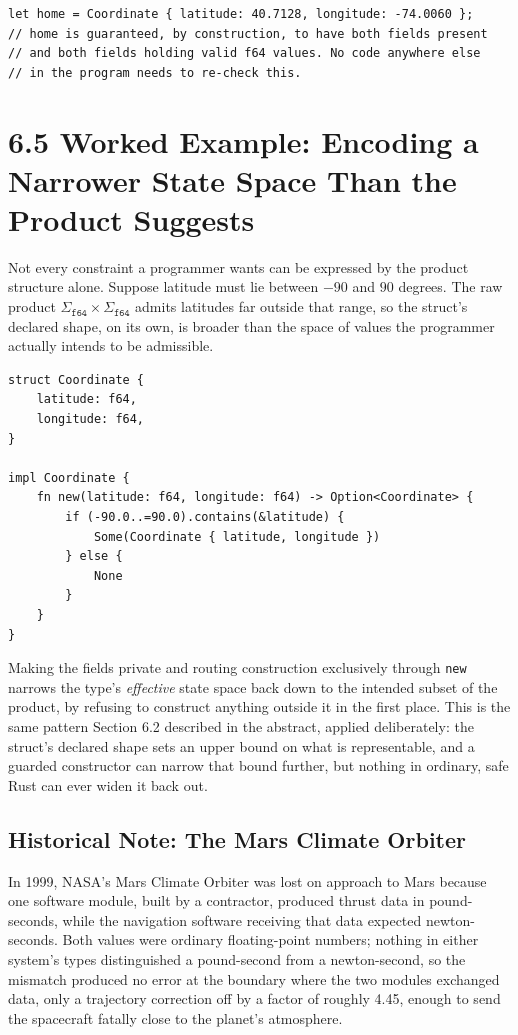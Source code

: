 \documentclass[11pt]{book}
\begin{document}
\begin{lstlisting}
let home = Coordinate { latitude: 40.7128, longitude: -74.0060 };
// home is guaranteed, by construction, to have both fields present
// and both fields holding valid f64 values. No code anywhere else
// in the program needs to re-check this.
\end{lstlisting}

\section*{6.5 Worked Example: Encoding a Narrower State Space Than the Product Suggests}

Not every constraint a programmer wants can be expressed by the product structure alone. Suppose latitude must lie between $-90$ and $90$ degrees. The raw product $\Sigma_{\texttt{f64}} \times \Sigma_{\texttt{f64}}$ admits latitudes far outside that range, so the struct's declared shape, on its own, is broader than the space of values the programmer actually intends to be admissible.

\begin{lstlisting}
struct Coordinate {
    latitude: f64,
    longitude: f64,
}

impl Coordinate {
    fn new(latitude: f64, longitude: f64) -> Option<Coordinate> {
        if (-90.0..=90.0).contains(&latitude) {
            Some(Coordinate { latitude, longitude })
        } else {
            None
        }
    }
}
\end{lstlisting}

Making the fields private and routing construction exclusively through \texttt{new} narrows the type's \emph{effective} state space back down to the intended subset of the product, by refusing to construct anything outside it in the first place. This is the same pattern Section 6.2 described in the abstract, applied deliberately: the struct's declared shape sets an upper bound on what is representable, and a guarded constructor can narrow that bound further, but nothing in ordinary, safe Rust can ever widen it back out.

\subsection*{Historical Note: The Mars Climate Orbiter}

In 1999, NASA's Mars Climate Orbiter was lost on approach to Mars because one software module, built by a contractor, produced thrust data in pound-seconds, while the navigation software receiving that data expected newton-seconds. Both values were ordinary floating-point numbers; nothing in either system's types distinguished a pound-second from a newton-second, so the mismatch produced no error at the boundary where the two modules exchanged data, only a trajectory correction off by a factor of roughly 4.45, enough to send the spacecraft fatally close to the planet's atmosphere.
\end{document}

